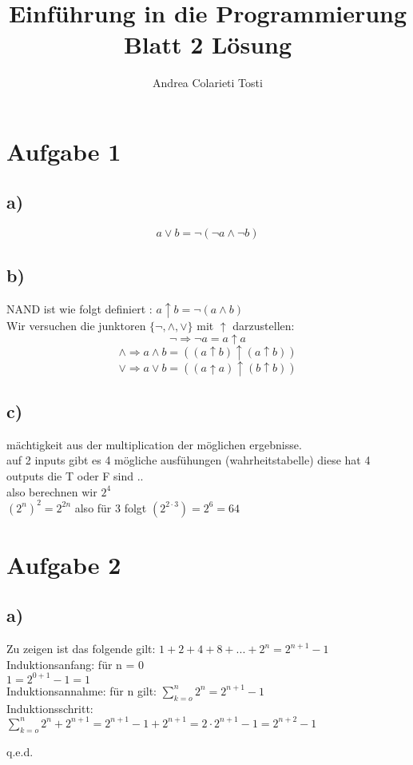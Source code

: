 \documentclass[12pt,a4paper]{article}
\author{Andrea Colarieti Tosti}
\title{Einführung in die Programmierung Blatt 2 Lösung}
\begin{document}
\maketitle

\section*{Aufgabe 1}
\subsection*{a)}
$$
  a \vee b = \neg ( \neg a \wedge \neg b)
$$
\subsection*{b)}
NAND ist wie folgt definiert :
$  a \uparrow b = \neg (a \wedge b) $\\
Wir versuchen die junktoren $\{ \neg ,\wedge,\vee\}$ mit $\uparrow$ darzustellen: \\
$$
\neg \Rightarrow \neg a = a \uparrow a
$$ $$
\wedge \Rightarrow a \wedge b = ((a \uparrow b) \uparrow (a \uparrow b))
$$ $$
\vee \Rightarrow a \vee b = ((a \uparrow a) \uparrow (b \uparrow b)) 
$$
\subsection*{c)}
mächtigkeit aus der multiplication der möglichen ergebnisse.\\ auf 2 inputs gibt es 4 mögliche ausfühungen (wahrheitstabelle) diese hat 4 outputs die T oder F sind ..\\
also berechnen wir $2^4$\\
$(2^n)^2 = 2^{2n}$ also für 3 folgt $(2^{2\cdot 3}) = 2^6 = 64$
\section*{Aufgabe 2}
\subsection*{a)}
Zu zeigen ist das folgende gilt: $ 1+2+4+8+...+2^n = 2^{n+1} -1$\\
Induktionsanfang: für n = 0 \\
$ 1 = 2^{0+1}-1=1$\\
Induktionsannahme: für n gilt:
$\sum_{k=o}^n 2^n = 2^{n+1}-1 $\\
Induktionsschritt:\\
$\sum_{k=o}^n 2^n + 2^{n+1} = 2^{n+1}-1 + 2^{n+1} = 2 \cdot 2^{n+1}-1 = 2^{n+2}-1 $
\begin{flushright}
q.e.d.
\end{flushright}
\end{document}
